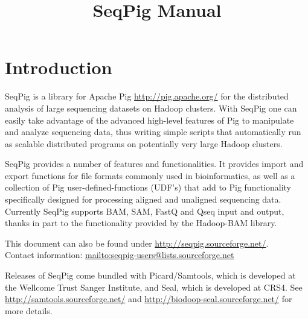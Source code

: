\documentclass[a4paper,parskip=half,10pt,bibtotoc,abstracton,oneside,noindent,DIV15]{scrartcl}
\title{SeqPig Manual}
\begin{document}
\maketitle

\tableofcontents
\newpage

\section{Introduction}

SeqPig is a library for Apache Pig \url{http://pig.apache.org/} for the
distributed analysis of large sequencing datasets on Hadoop clusters.  With
SeqPig one can easily take advantage of the advanced high-level features of Pig
to manipulate and analyze sequencing data, thus writing simple scripts that
automatically run as scalable distributed programs on potentially very large
Hadoop clusters.

SeqPig provides a number of features and functionalities.  It provides import
and export functions for file formats commonly used in bioinformatics, as well
as a collection of Pig user-defined-functions (UDF's) that add to Pig
functionality specifically designed for processing aligned and unaligned
sequencing data. Currently SeqPig supports BAM, SAM, FastQ and Qseq input and
output, thanks in part to the functionality provided by the Hadoop-BAM library.

This document can also be found under
\url{http://seqpig.sourceforge.net/}.\\ Contact information:
\url{mailto:seqpig-users@lists.sourceforge.net}

Releases of SeqPig come bundled with Picard/Samtools, which is
developed at the Wellcome Trust Sanger Institute, and Seal, which
is developed
at CRS4. See\\
\url{http://samtools.sourceforge.net/} and 
\url{http://biodoop-seal.sourceforge.net/}
for more details.




\end{document}
